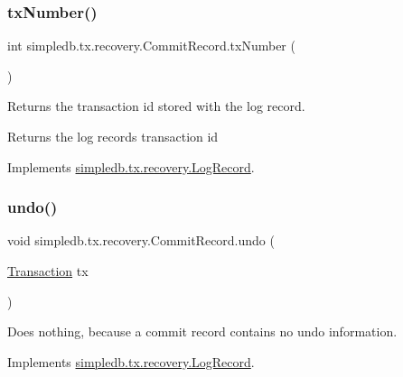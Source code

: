 \subsubsection{\texorpdfstring{tx\+Number()}{txNumber()}}
{\footnotesize\ttfamily int simpledb.\+tx.\+recovery.\+Commit\+Record.\+tx\+Number (\begin{DoxyParamCaption}{ }\end{DoxyParamCaption})\hspace{0.3cm}{\ttfamily [inline]}}

Returns the transaction id stored with the log record. \begin{DoxyReturn}{Returns}
the log record\textquotesingle{}s transaction id 
\end{DoxyReturn}


Implements \hyperlink{interfacesimpledb_1_1tx_1_1recovery_1_1LogRecord_a167f7406c18bf3367f1b83f6853870db}{simpledb.\+tx.\+recovery.\+Log\+Record}.

\mbox{\label{classsimpledb_1_1tx_1_1recovery_1_1CommitRecord_aa7a60156e7d7dfb10d2e6f8e4496f756}} 
\subsubsection{\texorpdfstring{undo()}{undo()}}
{\footnotesize\ttfamily void simpledb.\+tx.\+recovery.\+Commit\+Record.\+undo (\begin{DoxyParamCaption}\item[{\hyperlink{classsimpledb_1_1tx_1_1Transaction}{Transaction}}]{tx }\end{DoxyParamCaption})\hspace{0.3cm}{\ttfamily [inline]}}

Does nothing, because a commit record contains no undo information. 

Implements \hyperlink{interfacesimpledb_1_1tx_1_1recovery_1_1LogRecord_a1f1949e7f3746b9b8b3bc985c89214e5}{simpledb.\+tx.\+recovery.\+Log\+Record}.

\mbox{\label{classsimpledb_1_1tx_1_1recovery_1_1CommitRecord_a5170a623502e3c852ef3fb0fd76d3bde}} 
